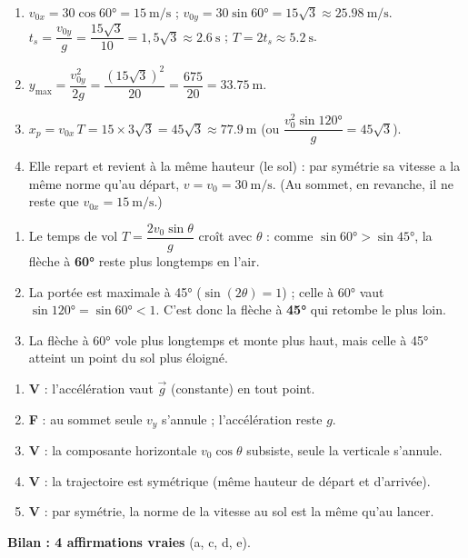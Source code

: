 \documentclass[11pt,a4paper]{article}
\newcommand{\vv}[1]{\vec{#1}}\newcommand{\ds}{\displaystyle}
\begin{document}

\begin{corrige}
\begin{enumerate}[label=\alph*)]
  \item $v_{0x}=30\cos\ang{60}=\qty{15}{\metre\per\second}$ ; $v_{0y}=30\sin\ang{60}=15\sqrt3\approx\qty{25,98}{\metre\per\second}$.
        $t_s=\dfrac{v_{0y}}{g}=\dfrac{15\sqrt3}{10}=1{,}5\sqrt3\approx\qty{2,6}{\second}$ ; $T=2t_s\approx\qty{5,2}{\second}$.
  \item $y_{\max}=\dfrac{v_{0y}^2}{2g}=\dfrac{(15\sqrt3)^2}{20}=\dfrac{675}{20}=\qty{33,75}{\metre}$.
  \item $x_p=v_{0x}\,T=15\times3\sqrt3=45\sqrt3\approx\qty{77,9}{\metre}$ (ou $\dfrac{v_0^2\sin\ang{120}}{g}=45\sqrt3$).
  \item Elle repart et revient à la même hauteur (le sol) : par symétrie sa vitesse a la même norme qu'au départ, $v=v_0=\qty{30}{\metre\per\second}$. (Au sommet, en revanche, il ne reste que $v_{0x}=\qty{15}{\metre\per\second}$.)
\end{enumerate}
\end{corrige}

\begin{corrige}[l'archer : 45° ou 60° ?]
\begin{enumerate}[label=\alph*)]
  \item Le temps de vol $T=\dfrac{2v_0\sin\theta}{g}$ croît avec $\theta$ : comme $\sin\ang{60}>\sin\ang{45}$, la flèche à \textbf{\ang{60}} reste plus longtemps en l'air.
  \item La portée est maximale à \ang{45} ($\sin(2\theta)=1$) ; celle à \ang{60} vaut $\sin\ang{120}=\sin\ang{60}<1$. C'est donc la flèche à \textbf{\ang{45}} qui retombe le plus loin.
  \item La flèche à \ang{60} vole plus longtemps et monte plus haut, mais celle à \ang{45} atteint un point du sol plus éloigné.
\end{enumerate}
\end{corrige}

\begin{corrige}
\begin{enumerate}[label=\alph*)]
  \item \textbf{V} : l'accélération vaut $\vv{g}$ (constante) en tout point.
  \item \textbf{F} : au sommet seule $v_y$ s'annule ; l'accélération reste $g$.
  \item \textbf{V} : la composante horizontale $v_0\cos\theta$ subsiste, seule la verticale s'annule.
  \item \textbf{V} : la trajectoire est symétrique (même hauteur de départ et d'arrivée).
  \item \textbf{V} : par symétrie, la norme de la vitesse au sol est la même qu'au lancer.
\end{enumerate}
\textbf{Bilan : 4 affirmations vraies} (a, c, d, e).
\end{corrige}
\end{document}
